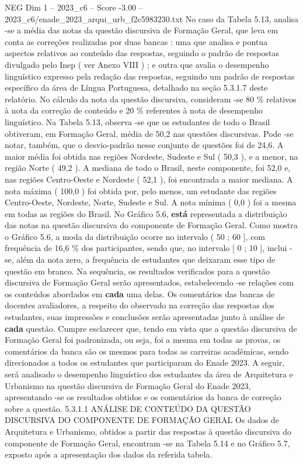\begin{textsample}{NEG Dim 1 – 2023\_c6 – Score -3.00 – 2023\_c6/enade\_2023\_arqui\_urb\_f2c5983230.txt}
No caso da Tabela 5.13, analisa -se a média das notas da questão discursiva de Formação Geral, que leva em conta as correções realizadas por duas bancas : uma que analisa e pontua aspectos relativos ao conteúdo das respostas, seguindo o padrão de respostas divulgado pelo Inep ( ver Anexo VIII ) ; e outra que avalia o desempenho linguístico expresso pela redação das respostas, seguindo um padrão de respostas específico da área de Língua Portuguesa, detalhado na seção 5.3.1.7 deste relatório.
No cálculo da nota da questão discursiva, consideram -se 80 \% relativos à nota da correção de conteúdo e 20 \% referentes à nota de desempenho linguístico.
Na Tabela 5.13, observa -se que os estudantes de todo o Brasil obtiveram, em Formação Geral, média de 50,2 nas questões discursivas.
Pode -se notar, também, que o desvio-padrão nesse conjunto de questões foi de 24,6.
A maior média foi obtida nas regiões Nordeste, Sudeste e Sul ( 50,3 ), e a menor, na região Norte ( 49,2 ).
A mediana de todo o Brasil, neste componente, foi 52,0 e, nas regiões Centro-Oeste e Nordeste ( 52,1 ), foi encontrada a maior mediana.
A nota máxima ( 100,0 ) foi obtida por, pelo menos, um estudante das regiões Centro-Oeste, Nordeste, Norte, Sudeste e Sul.
A nota mínima ( 0,0 ) foi a mesma em todas as regiões do Brasil.
No Gráfico 5.6, \textbf{está} representada a distribuição das notas na questão discursiva do componente de Formação Geral.
Como mostra o Gráfico 5.6, a moda da distribuição ocorre no intervalo ( 50 ; 60 ], com frequência de 16,6 \% dos participantes, sendo que, no intervalo [ 0 ; 10 ], inclui -se, além da nota zero, a frequência de estudantes que deixaram esse tipo de questão em branco.
Na sequência, os resultados verificados para a questão discursiva de Formação Geral serão apresentados, estabelecendo -se relações com os conteúdos abordados em \textbf{cada} uma delas.
Os comentários das bancas de docentes avaliadores, a respeito do observado na correção das respostas dos estudantes, suas impressões e conclusões serão apresentadas junto à análise de \textbf{cada} questão.
Cumpre esclarecer que, tendo em vista que a questão discursiva de Formação Geral foi padronizada, ou seja, foi a mesma em todas as provas, os comentários da banca são os mesmos para todas as carreiras acadêmicas, sendo direcionados a todos os estudantes que participaram do Enade 2023.
A seguir, será analisado o desempenho linguístico dos estudantes da área de Arquitetura e Urbanismo na questão discursiva de Formação Geral do Enade 2023, apresentando -se os resultados obtidos e os comentários da banca de correção sobre a questão. 5.3.1.1 ANÁLISE DE CONTEÚDO DA QUESTÃO DISCURSIVA DO COMPONENTE DE FORMAÇÃO GERAL Os dados de Arquitetura e Urbanismo, obtidos a partir das respostas à questão discursiva do componente de Formação Geral, encontram -se na Tabela 5.14 e no Gráfico 5.7, exposto após a apresentação dos dados da referida tabela.

\end{textsample}
